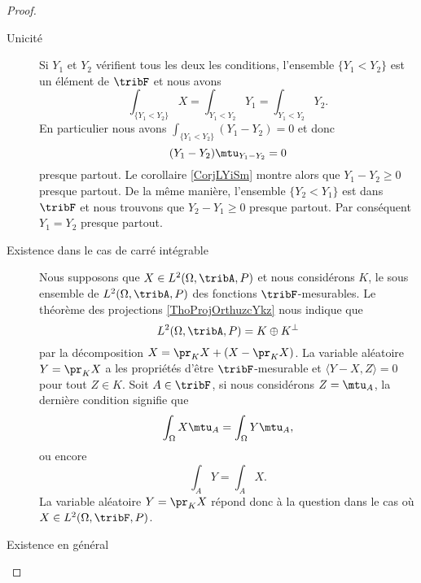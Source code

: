 \begin{proof}
    \begin{description}
        \item[Unicité] Si \( Y_1\) et \( Y_2\) vérifient tous les deux les conditions, l'ensemble \( \{ Y_1<Y_2 \}\) est un élément de \( \tribF\) et nous avons
            \begin{equation}
                \int_{\{ Y_1<Y_2 \}}X=\int_{Y_1<Y_2}Y_1=\int_{Y_1<Y_2}Y_2.
            \end{equation}
            En particulier nous avons \( \int_{\{ Y_1<Y_2 \}}(Y_1-Y_2)=0\) et donc
            \begin{equation}
                (Y_1-Y_2)\mtu_{Y_1-Y_2}=0
            \end{equation}
            presque partout. Le corollaire \ref{CorjLYiSm} montre alors que \( Y_1-Y_2\geq 0\) presque partout. De la même manière, l'ensemble \( \{ Y_2<Y_1 \}\) est dans \( \tribF\) et nous trouvons que \( Y_2-Y_1\geq 0\) presque partout. Par conséquent \( Y_1=Y_2\) presque partout.
        \item[Existence dans le cas de carré intégrable]

            Nous supposons que \( X\in L^2(\Omega,\tribA,P)\) et nous considérons \( K\), le sous ensemble de \( L^2(\Omega,\tribA,P)\) des fonctions \( \tribF\)-mesurables. Le théorème des projections \ref{ThoProjOrthuzcYkz} nous indique que
            \begin{equation}
                L^2(\Omega,\tribA,P)=K\oplus K^{\perp}
            \end{equation}
            par la décomposition \( X=\pr_{K}X+(X-\pr_KX)\). La variable aléatoire \( Y=\pr_KX\) a les propriétés d'être \( \tribF\)-mesurable et \( \langle Y-X, Z\rangle =0\) pour tout \( Z\in K\). Soit \( A\in\tribF\), si nous considérons \( Z=\mtu_A\), la dernière condition signifie que
            \begin{equation}
                \int_{\Omega}X\mtu_A=\int_{\Omega}Y\mtu_A,
            \end{equation}
            ou encore
            \begin{equation}
                \int_AY=\int_AX.
            \end{equation}
            La variable aléatoire \( Y=\pr_KX\) répond donc à la question dans le cas où \( X\in L^2(\Omega,\tribF,P)\).

        \item[Existence en général] 


\end{description}
\end{proof}

